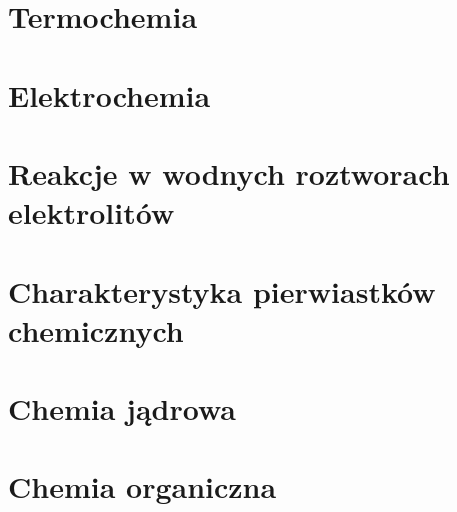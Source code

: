 \documentclass{createspace}
\begin{document}
\chapter{Termochemia}

\chapter{Elektrochemia}

\chapter{Reakcje w wodnych roztworach elektrolitów}

\chapter{Charakterystyka pierwiastków chemicznych}

\chapter{Chemia jądrowa}

\chapter{Chemia organiczna}


\raggedright



\printindex

\printindex[persons]
\end{document}
